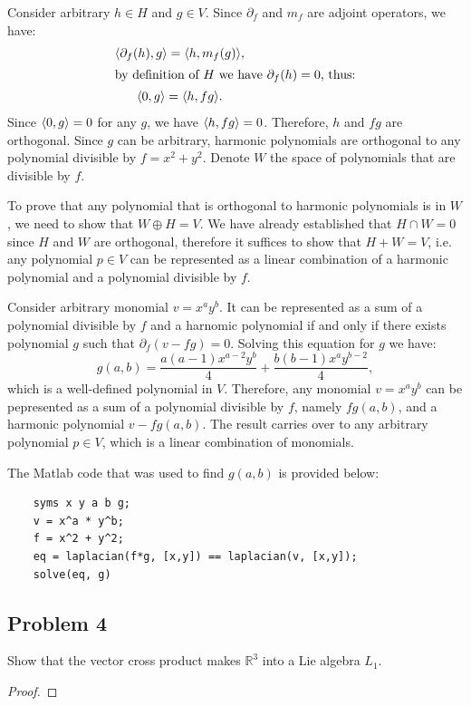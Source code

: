 \documentclass{article}
\theoremstyle{definition}
\newcommand{\R}{\mathbb{R}}
\DeclarePairedDelimiter\bilform{\langle}{\rangle}
\begin{document}
Consider arbitrary $h \in H$ and $g \in V$.
Since $\partial_f$ and $m_f$ are adjoint operators, we have:
\begin{gather*}
	\bilform{\partial_f(h), g} = \bilform{h, m_f(g)}, \\
	\intertext{by definition of $H$ we have $\partial_f(h) = 0$, thus:}
	\bilform{0, g} = \bilform{h, fg}.
\end{gather*}
Since $\bilform{0, g} = 0$ for any $g$, we have $\bilform{h, fg} = 0$.
Therefore, $h$ and $fg$ are orthogonal.
Since $g$ can be arbitrary, harmonic polynomials are orthogonal to any polynomial divisible by $f = x^2+y^2$.
Denote $W$ the space of polynomials that are divisible by $f$.

To prove that any polynomial that is orthogonal to harmonic polynomials is in $W$, we need to show that $W \oplus H = V$.
We have already established that $H \cap W = 0$ since $H$ and $W$ are orthogonal, therefore it suffices to show that $H + W = V$, i.e. any polynomial $p \in V$ can be represented as a linear combination of a harmonic polynomial and a polynomial divisible by $f$.

Consider arbitrary monomial $v = x^a y^b$.
It can be represented as a sum of a polynomial divisible by $f$ and a harnomic polynomial if and only if there exists polynomial $g$ such that $\partial_f (v - fg) = 0$.
Solving this equation for $g$ we have:
\[
	g(a,b) = \frac{a(a-1) x^{a-2} y^b}{4} + \frac{b(b-1) x^a y^{b-2}}{4},
\]
which is a well-defined polynomial in $V$.
Therefore, any monomial $v = x^a y^b$ can be pepresented as a sum of a polynomial divisible by $f$, namely $fg(a,b)$, and a harmonic polynomial $v - fg(a,b)$.
The result carries over to any arbitrary polynomial $p \in V$, which is a linear combination of monomials.

The Matlab code that was used to find $g(a,b)$ is provided below: 
\begin{verbatim}
    syms x y a b g;
    v = x^a * y^b;
    f = x^2 + y^2;
    eq = laplacian(f*g, [x,y]) == laplacian(v, [x,y]);
    solve(eq, g)
\end{verbatim}


\subsection*{Problem 4}

\begin{tcolorbox}
Show that the vector cross product makes $\R^3$ into a Lie algebra $L_1$.
\end{tcolorbox}

\begin{proof}
\end{proof}
\end{document}
